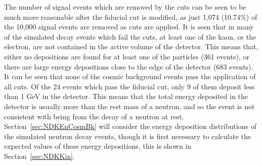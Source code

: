 The number of signal events which are removed by the cuts can be seen to be much more reasonable after the fiducial cut is modified, as just 1,074 (10.74\%) of the 10,000 signal events are removed as cuts are applied. It is seen that in many of the simulated decay events which fail the cuts, at least one of the kaon, or the electron, are not contained in the active volume of the detector. This means that, either no depositions are found for at least one of the particles (361 events), or there are large energy depositions close to the edge of the detector (683 events). \\

It can be seen that none of the cosmic background events pass the application of all cuts. Of the 24 events which pass the fiducial cut, only 9 of them deposit less than 1 GeV in the detector. This means that the total energy deposited in the detector is usually more than the rest mass of a neutron, and so the event is not consistent with being from the decay of a neutron at rest. Section~\ref{sec:NDKEnCosmBk} will consider the energy deposition distributions of the simulated neutron decay events, though it is first necessary to calculate the expected values of these energy depositions, this is shown in Section~\ref{sec:NDKKin}. \\

